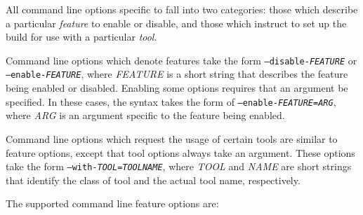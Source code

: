 All command line options specific to \libflame fall into two categories:
those which describe a particular {\em feature} to enable or disable,
and those which instruct \configure to set up the build for use with a
particular {\em tool}.

Command line options which denote features take the form
{\tt --disable-{\em FEATURE}} or
{\tt --enable-{\em FEATURE}}, where {\em FEATURE} is a short string that
describes the feature being enabled or disabled.
Enabling some options requires that an argument be specified.
In these cases, the syntax takes the form of
{\tt --enable-{\em FEATURE}={\em ARG}}, where {\em ARG} is an argument
specific to the feature being enabled.

Command line options which request the usage of certain tools are
similar to feature options, except that tool options always take an
argument.
These options take the form
{\tt --with-{\em TOOL}={\em TOOLNAME}}, where {\em TOOL} and {\em NAME}
are short strings that identify the class of tool and the actual tool name,
respectively.

The supported command line feature options are: \\

